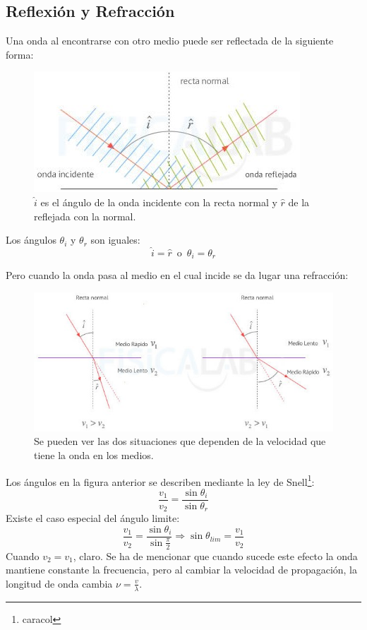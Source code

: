 \documentclass[arial,a4paper,print]{article}
\begin{document}
\subsection{Reflexión y Refracción}
Una onda al encontrarse con otro medio puede ser reflectada de la siguiente forma:
\begin{figure}[h]
	\centering
	\includegraphics[width=0.4\linewidth]{onda-reflejada}
	\caption{$\hat{i}$ es el ángulo de la onda incidente con la recta normal y $\hat{r}$ de la reflejada con la normal.}
	\label{fig:onda-reflejada}
\end{figure}
Los ángulos $\theta_i$ y $\theta_r$ son iguales:
\begin{equation*}
	\hat{i}=\hat{r}\, \text{ o } \,\theta_i = \theta_r
\end{equation*}

Pero cuando la onda pasa al medio en el cual incide se da lugar una refracción:
\begin{figure}[h]
		\centering
		\includegraphics[width=.5\textwidth]{refraccion-ondas1}
		\caption{Se pueden ver las dos situaciones que dependen de la velocidad que tiene la onda en los medios.}
		\label{fig:refraccion1}
\end{figure}

Los ángulos en la figura anterior se describen mediante la ley de Snell\footnote{caracol}:
\begin{equation*}
	\frac{v_{1}}{v_{2}} = \frac{\sin\theta_i}{\sin\theta_r}
\end{equation*}
Existe el caso especial del ángulo limite:
\begin{equation*}
	\frac{v_{1}}{v_{2}} = \frac{\sin\theta_i}{\sin\frac\pi2} \Rightarrow \sin\theta_{lim} = \frac{v_{1}}{v_{2}}
\end{equation*} 
Cuando $v_{2} = v_{1}$, claro. Se ha de mencionar que cuando sucede este efecto la onda mantiene constante la frecuencia, pero al cambiar la velocidad de propagación, la longitud de onda cambia $\nu = \frac v\lambda$. 
\end{document}
